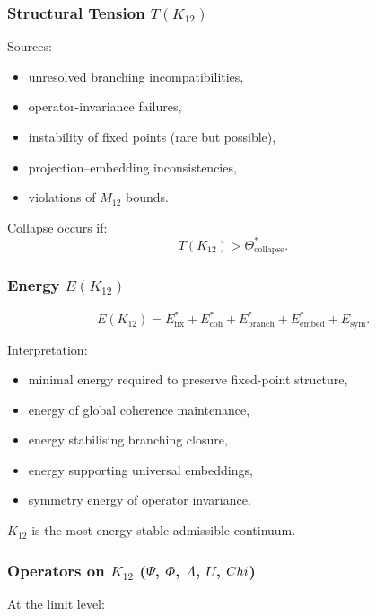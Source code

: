 \subsubsection{Structural Tension $T(K_{12})$}

Sources:
\begin{itemize}
    \item unresolved branching incompatibilities,
    \item operator-invariance failures,
    \item instability of fixed points (rare but possible),
    \item projection–embedding inconsistencies,
    \item violations of $M_{12}$ bounds.
\end{itemize}

Collapse occurs if:
\[
T(K_{12}) > \Theta^*_{\mathrm{collapse}}.
\]

\subsubsection{Energy $E(K_{12})$}

\[
E(K_{12}) =
E_{\mathrm{fix}}^*
+E_{\mathrm{coh}}^*
+E_{\mathrm{branch}}^*
+E_{\mathrm{embed}}^*
+E_{\mathrm{sym}}.
\]

Interpretation:
\begin{itemize}
    \item minimal energy required to preserve fixed-point structure,
    \item energy of global coherence maintenance,
    \item energy stabilising branching closure,
    \item energy supporting universal embeddings,
    \item symmetry energy of operator invariance.
\end{itemize}

$K_{12}$ is the most energy-stable admissible continuum.

\subsubsection{Operators on $K_{12}$ ($\Psi$, $\Phi$, $\Lambda$, $U$, $Chi$)}

At the limit level:

